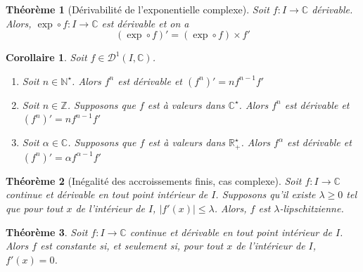 \documentclass[french]{book}
\newcommand{\N}{\mathbb{N}}
\newcommand{\Z}{\mathbb{Z}}
\newcommand{\R}{\mathbb{R}}
\newcommand{\C}{\mathbb{C}}
\newcommand{\st}{^\star}
\theoremstyle{plain}
\newtheorem{thm}{Théorème}[chapter]
\newtheorem{cor}{Corollaire}[chapter]
\theoremstyle{definition}
\theoremstyle{remark}
\begin{document}
\begin{thm}[Dérivabilité de l'exponentielle complexe]
	Soit $f:I\rightarrow\C$ dérivable. Alors, $\exp\circ f:I\rightarrow\C$ est dérivable et on a $$(\exp\circ f)'=(\exp\circ f)\times f'$$
\end{thm}
\begin{cor}
	Soit $f\in\mathcal{D}^1(I,\C)$.
	\begin{enumerate}
		\item Soit $n\in\N\st$. Alors $f^n$ est dérivable et $(f^n)'=nf^{n-1}f'$
		\item Soit $n\in\Z$. Supposons que $f$ est à valeurs dans $\C\st$. Alors $f^n$ est dérivable et $(f^n)'=nf^{n-1}f'$
		\item Soit $\alpha\in\C$. Supposons que $f$ est à valeurs dans $\R_+\st$. Alors $f^\alpha$ est dérivable et $(f^n)'=\alpha f^{\alpha-1}f'$
	\end{enumerate}
\end{cor}
\begin{thm}[Inégalité des accroissements finis, cas complexe]
	Soit $f:I\rightarrow\C$ continue et dérivable en tout point intérieur de $I$. Supposons qu'il existe $\lambda\geqslant 0$ tel que pour tout $x$ de l'intérieur de $I$, $|f'(x)|\leqslant \lambda$. Alors, $f$ est $\lambda$-lipschitzienne.
\end{thm}
\begin{thm}
	Soit $f:I\rightarrow\C$ continue et dérivable en tout point intérieur de $I$. Alors $f$ est constante si, et seulement si, pour tout $x$ de l'intérieur de $I$, $f'(x)=0$.
\end{thm}
\end{document}

